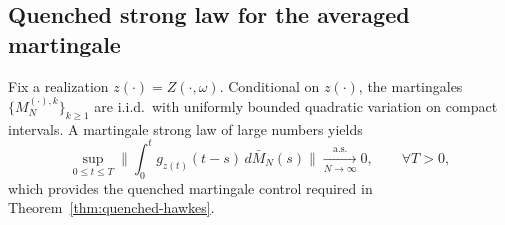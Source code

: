 \documentclass[12pt,a4paper]{article}
\theoremstyle{plain}
\theoremstyle{definition}
\theoremstyle{remark}
\begin{document}
	\subsection{Quenched strong law for the averaged martingale}
	Fix a realization $z(\cdot)=Z(\cdot,\omega)$.
	Conditional on $z(\cdot)$, the martingales $\{M_N^{(\cdot),k}\}_{k\ge1}$ are i.i.d.\ with
	uniformly bounded quadratic variation on compact intervals.
	A martingale strong law of large numbers yields
	\[
	\sup_{0\le t\le T}
	\Big\|
	\int_0^t g_{z(t)}(t-s)\,d\bar M_N(s)
	\Big\|
	\xrightarrow[N\to\infty]{\mathrm{a.s.}} 0,
	\qquad \forall T>0,
	\]
	which provides the quenched martingale control required in Theorem~\ref{thm:quenched-hawkes}.
	
	
	
	
	
	
	
	
	
	
	
	
	
	
	
	
	
	
	
	
	
	
\end{document}
